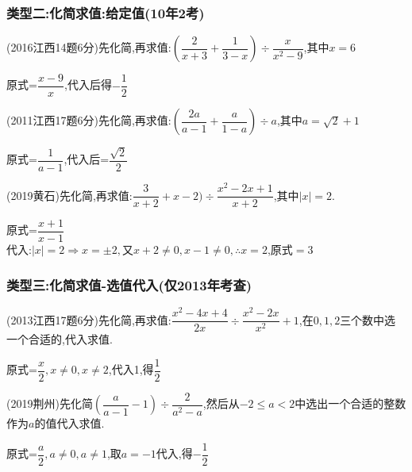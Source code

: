 \documentclass[cn,blue,12pt]{elegantbook}
\begin{document}
\subsubsection{类型二:化简求值:给定值(10年2考)}%
\begin{zhenti}[resume]
\item (2016江西14题6分)先化简,再求值:\((\dfrac{2}{x+3}+\dfrac{1}{3-x})\div \dfrac{x}{x^2-9}\),其中\(x=6\)
\begin{solution}
        原式=\(\dfrac{x-9}{x}\),代入后得\(-\dfrac{1}{2}\)\\
\end{solution}
\item (2011江西17题6分)先化简,再求值:\((\dfrac{2a}{a-1}+\dfrac{a}{1-a})\div a\),其中\(a=\sqrt{2}+1\)
\begin{solution}
        原式=\(\dfrac{1}{a-1}\),代入后=\(\dfrac{\sqrt{2}}{2}\)\\
\end{solution}
\item (2019黄石)先化简,再求值:\(\dfrac{3}{x+2}+x-2)\div \dfrac{x^2-2x+1}{x+2}\),其中\(|x|=2\).
\begin{solution}
        原式=\(\dfrac{x+1}{x-1}\)\\
        代入:\(|x|=2 \Rightarrow x=\pm 2,\text{又}x+2 \ne 0,x-1\ne 0 ,\therefore x=2\),原式\(=3\)
\end{solution}
\end{zhenti}

\subsubsection{类型三:化简求值-选值代入(仅2013年考查)}%
\begin{zhenti}[resume]
\item (2013江西17题6分)先化简,再求值:\(\dfrac{x^2-4x+4}{2x}\div \dfrac{x^2-2x}{x^2}+1\),在\(0,1,2\)三个数中选一个合适的,代入求值.
\begin{solution}
        原式=\(\dfrac{x}{2},x\ne 0,x\ne 2\),代入1,得\(\dfrac{1}{2}\)\\
\end{solution}
\item (2019荆州)先化简\((\dfrac{a}{a-1}-1)\div \dfrac{2}{a^2-a}\),然后从\(-2\le a <2\)中选出一个合适的整数作为\(a\)的值代入求值.
\begin{solution}
        原式=\(\dfrac{a}{2},a\ne 0,a\ne 1\),取\(a=-1\)代入,得\(-\dfrac{1}{2}\)\\
\end{solution}
\end{zhenti}
\end{document}
